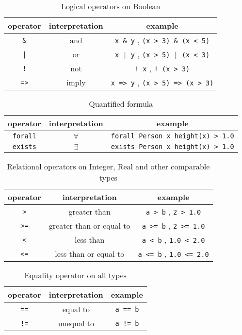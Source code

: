 \documentclass[12pt]{article}
\begin{document}
\begin{table}[H]
\centering
\caption{Logical operators on Boolean}
\begin{tabular}{ c c c }
\toprule 
operator & interpretation & example \\
\midrule
\verb|&| & and & \verb|x & y| , \verb|(x > 3) & (x < 5)| \\ 
{\tt |} & or & \verb#x | y# , \verb#(x > 5) | (x < 3)# \\ 
{\tt !} & not & \verb|! x| , \verb|! (x > 3)| \\
{\tt =>} & imply & \verb|x => y| , \verb|(x > 5) => (x > 3)| \\
\bottomrule
\end{tabular}
\end{table}

\begin{table}[H]
\centering
\caption{Quantified formula}
\begin{tabular}{ c c c }
\toprule 
operator & interpretation & example \\
\midrule
{\tt forall} & $\forall$ & \verb|forall Person x height(x) > 1.0| \\ 
{\tt exists} & $\exists$ & \verb|exists Person x height(x) > 1.0|  \\ 
\bottomrule
\end{tabular}
\end{table}

\begin{table}[H]
\centering
\caption{Relational operators on Integer, Real and other comparable types}
\begin{tabular}{ c c c }
\toprule 
operator & interpretation & example \\
\midrule
{\tt >} & greater than & \verb|a > b| ,  \verb|2 > 1.0|\\ 
{\tt >=} & greater than or equal to & \verb|a >= b| ,  \verb|2 >= 1.0| \\ 
{\tt <} & less than & \verb|a < b| ,  \verb|1.0 < 2.0| \\
{\tt <=} & less than or equal to & \verb|a <= b| ,  \verb|1.0 <= 2.0|  \\
\bottomrule
\end{tabular}
\end{table}

\begin{table}[H]
\centering
\caption{Equality operator on all types}
\begin{tabular}{ c c c }
\toprule 
operator & interpretation & example \\
\midrule
{\tt ==} & equal to & \verb|a == b|   \\ 
{\tt !=} & unequal to & \verb|a != b|  \\ 
\bottomrule
\end{tabular}
\end{table}
\end{document}
